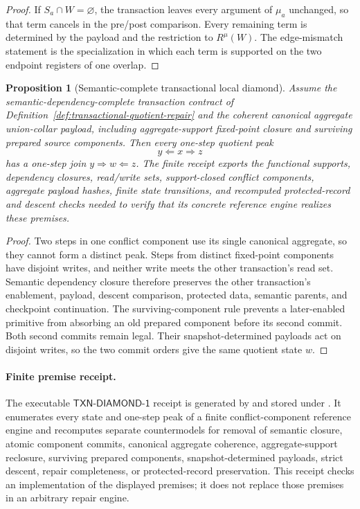 \documentclass[11pt]{article}
\newtheorem{proposition}[theorem]{Proposition}
\begin{document}
\begin{proof}
If \(S_a\cap W=\varnothing\), the transaction leaves every argument of \(\mu_a\) unchanged, so that
term cancels in the pre/post comparison. Every remaining term is determined by the payload and the
restriction to \(R^\mu(W)\). The edge-mismatch statement is the specialization in which each term
is supported on the two endpoint registers of one overlap.
\end{proof}

\begin{proposition}[Semantic-complete transactional local diamond]
\label{prop:semantic-transaction-diamond}
Assume the semantic-dependency-complete transaction contract of
Definition~\ref{def:transactional-quotient-repair} and the coherent canonical aggregate
union-collar payload, including aggregate-support fixed-point closure and surviving prepared
source components. Then every one-step quotient peak
\[
y\Leftarrow x\Rightarrow z
\]
has a one-step join \(y\Rightarrow w\Leftarrow z\). The finite receipt exports the functional
supports, dependency closures, read/write sets, support-closed conflict components, aggregate
payload hashes, finite state transitions, and recomputed protected-record and descent checks
needed to verify that its concrete reference engine realizes these premises.
\end{proposition}

\begin{proof}
Two steps in one conflict component use its single canonical aggregate, so they cannot form a
distinct peak. Steps from distinct fixed-point components have disjoint writes, and neither write meets the
other transaction's read set. Semantic dependency closure therefore preserves the other
transaction's enablement, payload, descent comparison, protected data, semantic parents, and
checkpoint continuation. The surviving-component rule prevents a later-enabled primitive from
absorbing an old prepared component before its second commit. Both second commits remain legal.
Their snapshot-determined payloads
act on disjoint writes, so the two commit orders give the same quotient state \(w\).
\end{proof}

\paragraph{Finite premise receipt.}
The executable \(\mathsf{TXN\text{-}DIAMOND\text{-}1}\) receipt is generated by
 and stored under
.  It
enumerates every state and one-step peak of a finite conflict-component
reference engine and recomputes separate countermodels for removal of
semantic closure, atomic component commits, canonical aggregate coherence,
aggregate-support reclosure, surviving prepared components, snapshot-determined payloads,
strict descent, repair completeness, or protected-record preservation.  This
receipt checks an implementation of the displayed premises; it does not
replace those premises in an arbitrary repair engine.
\end{document}
